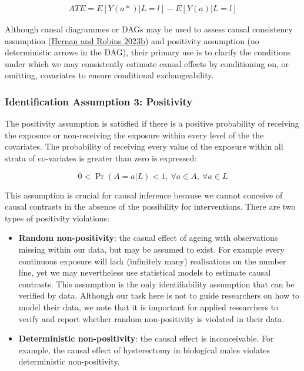 \documentclass[
  singlecolumn]{report}
\begin{document}
\[
\begin{aligned}
ATE = E[Y(a*)|L = l] - E[Y(a)|L = l] 
\end{aligned}
\]

Although causal diagrammes or DAGs may be used to assess causal
consistency assumption (\protect\hyperlink{ref-hernan2023b}{Hernan and
Robins 2023b}) and positivity assumption (no deterministic arrows in the
DAG), their primary use is to clarify the conditions under which we may
consistently estimate causal effects by conditioning on, or omitting,
covariates to ensure conditional exchangeability.

\hypertarget{identification-assumption-3-positivity}{%
\subsubsection{Identification Assumption 3:
Positivity}\label{identification-assumption-3-positivity}}

The positivity assumption is satisfied if there is a positive
probability of receiving the exposure or non-receiving the exposure
within every level of the the covariates. The probability of receiving
every value of the exposure within all strata of co-variates is greater
than zero is expressed:

\begin{equation}
0 < \Pr(A=a|L)<1, ~ \forall a \in A, ~ \forall a \in L
\end{equation}

This assumption is crucial for causal inference because we cannot
conceive of causal contrasts in the absence of the possibility for
interventions. There are two types of positivity violations:

\begin{itemize}
\item
  \textbf{Random non-positivity}: the casual effect of ageing with
  observations missing within our data, but may be assumed to exist. For
  example every continuous exposure will lack (infinitely many)
  realisations on the number line, yet we may nevertheless use
  statistical models to estimate causal contrasts. This assumption is
  the only identifiability assumption that can be verified by data.
  Although our task here is not to guide researchers on how to model
  their data, we note that it is important for applied researchers to
  verify and report whether random non-positivity is violated in their
  data.
\item
  \textbf{Deterministic non-positivity}: the causal effect is
  inconceivable. For example, the causal effect of hysterectomy in
  biological males violates deterministic non-positivity.
\end{itemize}
\end{document}
